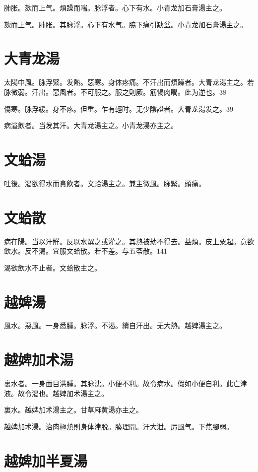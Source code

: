 \documentclass[12pt,twoside,UTF8,b5paper]{ctexbook}
\begin{document}
肺胀。欬而上气。煩躁而喘。脉浮者。心下有水。小青龙加石膏湯主之。

欬而上气。肺胀。其脉浮。心下有水气。脇下痛引缺盆。小青龙加石膏湯主之。

\section{大青龙湯}

太陽中風。脉浮緊。发熱。惡寒。身体疼痛。不汗出而煩躁者。大青龙湯主之。若脉微弱。汗出。惡風者。不可服之。服之則厥。筋愓肉瞤。此为逆也。38

傷寒。脉浮緩。身不疼。但重。乍有輕时。无少陰證者。大青龙湯发之。39

病溢飲者。当发其汗。大青龙湯主之。小青龙湯亦主之。

\section{文蛤湯}

吐後。渴欲得水而貪飲者。文蛤湯主之。兼主微風。脉緊。頭痛。

\section{文蛤散}

病在陽。当以汗觧。反以水潠之或灌之。其熱被劫不得去。益煩。皮上粟起。意欲飲水。反不渴。宜服文蛤散。若不差。与五苓散。141

渴欲飲水不止者。文蛤散主之。

\section{越婢湯}

風水。惡風。一身悉腫。脉浮。不渴。續自汗出。无大熱。越婢湯主之。

\section{越婢加术湯}

裏水者。一身面目洪腫。其脉沈。小便不利。故令病水。假如小便自利。此亡津液。故令渴也。越婢加术湯主之。

裏水。越婢加术湯主之。甘草麻黄湯亦主之。

越婢加术湯。治肉極熱則身体津脱。腠理開。汗大泄。厉風气。下焦腳弱。

\section{越婢加半夏湯}
\end{document}
